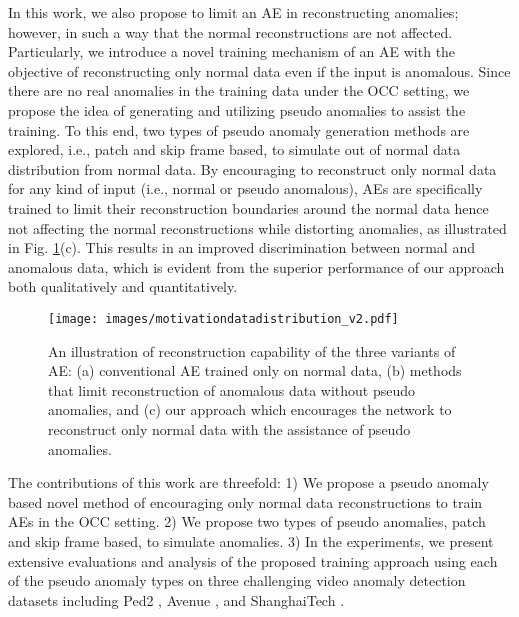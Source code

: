 \documentclass{bmvc2k}
\begin{document}
In this work, we also propose to limit an AE in reconstructing anomalies; however, in such a way that the normal reconstructions are not affected.
Particularly, we introduce a novel training mechanism of an AE with the objective of reconstructing only normal data even if the input is anomalous.
Since there are no real anomalies in the training data under the OCC setting, we propose the idea of generating and utilizing pseudo anomalies to assist the training. To this end, two types of pseudo anomaly generation methods are explored, i.e., patch and skip frame based, 
to simulate out of normal data distribution from normal data.
By encouraging to reconstruct only normal data for any kind of input (i.e., normal or pseudo anomalous), 
AEs are specifically trained to limit their reconstruction boundaries around the normal data hence not affecting the normal reconstructions while distorting anomalies, as illustrated in Fig. \ref{fig:motivationdatadistribution}(c). This results in an improved discrimination between normal and anomalous data, which is evident from the superior performance of our approach both qualitatively and quantitatively.


\begin{figure}
\begin{center}
\texttt{[image: images/motivationdatadistribution\_v2.pdf]}
\vspace{-10mm}
\end{center}
   \caption{An illustration of reconstruction capability of the three variants of AE: (a) conventional AE trained only on normal data, (b) methods that limit reconstruction of anomalous data without pseudo anomalies, and (c) our approach which encourages the network to reconstruct only normal data with the assistance of pseudo anomalies.}
\label{fig:motivationdatadistribution}
\end{figure}

The contributions of this work are threefold: 1) We propose a pseudo anomaly based novel method of encouraging only normal data reconstructions to train AEs in the OCC setting. 2) We propose two types of pseudo anomalies, patch and skip frame based, to simulate anomalies. 3) In the experiments, we present extensive evaluations and analysis of the proposed training approach using each of the  pseudo anomaly types on three challenging video anomaly detection datasets including Ped2 \cite{li2013anomaly}, Avenue \cite{lu2013abnormal}, and ShanghaiTech \cite{luo2017revisit}.

\vspace{-4mm}
\end{document}

